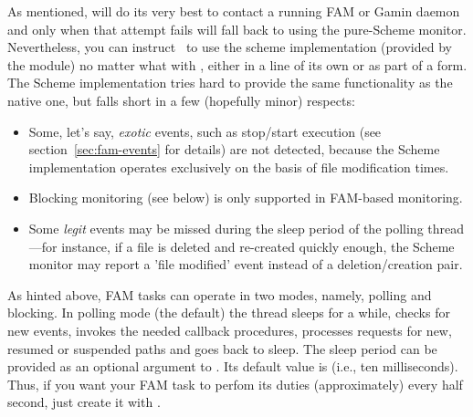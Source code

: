 As mentioned,  will do its very best to contact a
running FAM or Gamin daemon and only when that attempt fails will fall
back to using the pure-Scheme monitor. Nevertheless, you can instruct
\MzFam\ to use the scheme implementation (provided by the 
module) no matter what with , either in a
line of its own or as part of a  form. The Scheme
implementation tries hard to provide the same functionality as the
native one, but falls short in a few (hopefully minor) respects:
\begin{itemize}
\item Some, let's say, \textit{exotic} events, such as stop/start
  execution (see section~\ref{sec:fam-events} for details) are not
  detected, because the Scheme implementation operates exclusively on
  the basis of file modification times.
\item Blocking monitoring (see below) is only supported in FAM-based
  monitoring.
\item Some \textit{legit} events may be missed during the sleep period
  of the polling thread---for instance, if a file is deleted and
  re-created quickly enough, the Scheme monitor may report a 'file
  modified' event instead of a deletion/creation pair.
\end{itemize}

As hinted above, FAM tasks can operate in two modes, namely, polling
and blocking. In polling mode (the default) the thread sleeps for a
while, checks for new events, invokes the needed callback procedures,
processes requests for new, resumed or suspended paths and goes back
to sleep. The sleep period can be provided as an optional argument to
. Its default value is  (i.e., ten
milliseconds). Thus, if you want your FAM task to perfom its duties
(approximately) every half second, just create it with
.

